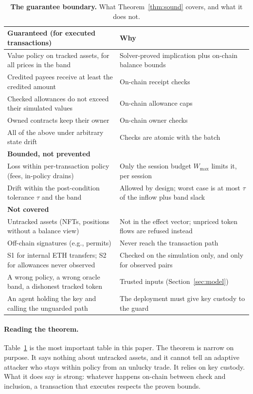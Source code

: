 \documentclass[11pt]{article}
\begin{document}
\begin{table}[t]
\centering\small
\caption{\textbf{The guarantee boundary.} What Theorem~\ref{thm:sound} covers, and what it does not.}
\label{tab:boundary}
\begin{tabularx}{\textwidth}{>{\raggedright\arraybackslash}p{}X}
\toprule
\textbf{Guaranteed (for executed transactions)} & \textbf{Why} \\
\midrule
Value policy on tracked assets, for all prices in the band & Solver-proved implication plus on-chain balance bounds \\
Credited payees receive at least the credited amount & On-chain receipt checks \\
Checked allowances do not exceed their simulated values & On-chain allowance caps \\
Owned contracts keep their owner & On-chain owner checks \\
All of the above under arbitrary state drift & Checks are atomic with the batch \\
\midrule
\textbf{Bounded, not prevented} & \\
\midrule
Loss within per-transaction policy (fees, in-policy drains) & Only the session budget $W_{\max}$ limits it, per session \\
Drift within the post-condition tolerance $\tau$ and the band & Allowed by design; worst case is at most $\tau$ of the inflow plus band slack \\
\midrule
\textbf{Not covered} & \\
\midrule
Untracked assets (NFTs, positions without a balance view) & Not in the effect vector; unpriced token flows are refused instead \\
Off-chain signatures (e.g., permits) & Never reach the transaction path \\
S1 for internal ETH transfers; S2 for allowances never observed & Checked on the simulation only, and only for observed pairs \\
A wrong policy, a wrong oracle band, a dishonest tracked token & Trusted inputs (Section~\ref{sec:model}) \\
An agent holding the key and calling the unguarded path & The deployment must give key custody to the guard \\
\bottomrule
\end{tabularx}
\end{table}

\paragraph{Reading the theorem.} Table~\ref{tab:boundary} is the most important table in this paper. The theorem is narrow on purpose. It says nothing about untracked assets, and it cannot tell an adaptive attacker who stays within policy from an unlucky trade. It relies on key custody. What it does say is strong: whatever happens on-chain between check and inclusion, a transaction that executes respects the proven bounds.
\end{document}
